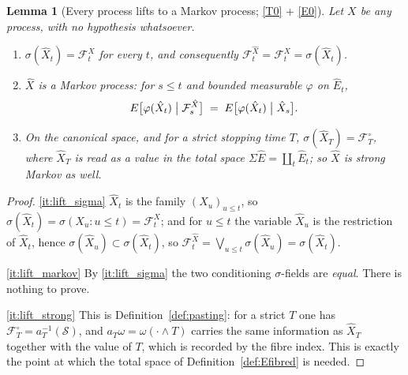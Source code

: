 \documentclass[11pt,a4paper]{article}
\theoremstyle{plain}
\newtheorem{lemma}[theorem]{Lemma}
\theoremstyle{definition}
\theoremstyle{remark}
\newcommand{\Filt}{\mathcal{F}}
\begin{document}
\begin{lemma}[Every process lifts to a Markov process; \eqref{T0} + \eqref{E0}]
  \label{lem:liftmarkov}
  Let $X$ be any process, with no hypothesis whatsoever.
  \begin{enumerate}[label=(\alph*)]
  \item \label{it:lift_sigma}
    $\sigma(\hat{X}_t) = \Filt^X_t$ for every $t$, and consequently
    $\Filt^{\hat{X}}_t = \Filt^X_t = \sigma(\hat{X}_t)$.
  \item \label{it:lift_markov}
    $\hat{X}$ is a Markov process: for $s \leq t$ and bounded measurable
    $\varphi$ on $\hat{E}_t$,
    \[
      E\bigl[ \varphi(\hat{X}_t) \bigm| \Filt^{\hat{X}}_s \bigr]
        \;=\; E\bigl[ \varphi(\hat{X}_t) \bigm| \hat{X}_s \bigr] .
    \]
  \item \label{it:lift_strong}
    On the canonical space, and for a \emph{strict} stopping time $T$,
    $\sigma(\hat{X}_T) = \Filt^{\circ}_T$, where $\hat{X}_T$ is read as a value in
    the total space $\Sigma\hat{E} = \coprod_t \hat{E}_t$; so $\hat{X}$ is strong
    Markov as well.
  \end{enumerate}
\end{lemma}

\begin{proof}
  \ref{it:lift_sigma}  $\hat{X}_t$ is the family $(X_u)_{u \leq t}$, so
  $\sigma(\hat{X}_t) = \sigma(X_u : u \leq t) = \Filt^X_t$; and for $u \leq t$ the
  variable $\hat{X}_u$ is the restriction of $\hat{X}_t$, hence
  $\sigma(\hat{X}_u) \subset \sigma(\hat{X}_t)$, so
  $\Filt^{\hat{X}}_t = \bigvee_{u \leq t}\sigma(\hat{X}_u) = \sigma(\hat{X}_t)$.

  \ref{it:lift_markov}  By \ref{it:lift_sigma} the two conditioning
  $\sigma$-fields are \emph{equal}.  There is nothing to prove.

  \ref{it:lift_strong}  This is Definition~\ref{def:pasting}: for a strict $T$ one
  has $\Filt^\circ_T = a_T^{-1}(\mathcal{S})$, and $a_T\omega = \omega(\cdot \wedge T)$
  carries the same information as $\hat{X}_T$ together with the value of $T$,
  which is recorded by the fibre index.  This is exactly the point at which the
  total space of Definition~\ref{def:Efibred} is needed.
\end{proof}
\end{document}
